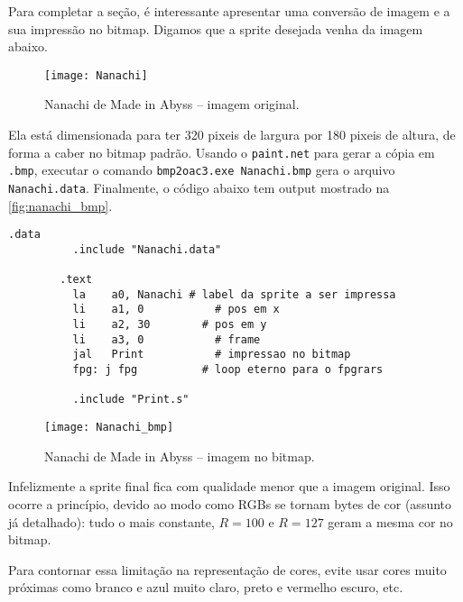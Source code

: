 \documentclass[10pt, a4paper, twoside]{article}
\begin{document}
        Para completar a seção, é interessante apresentar uma conversão de imagem e a sua impressão no bitmap.
        Digamos que a sprite desejada venha da imagem abaixo.
        \begin{figure}[H]\centering
            \caption{Nanachi de Made in Abyss -- imagem original.}
            \texttt{[image: Nanachi]}
        \end{figure}
        Ela está dimensionada para ter 320 pixeis de largura por 180 pixeis de altura, de forma a caber no bitmap padrão.
        Usando o {\tt paint.net} para gerar a cópia em {\tt .bmp}, executar o comando 
        \verb|bmp2oac3.exe Nanachi.bmp| gera o arquivo 
        {\tt Nanachi.data}.
        Finalmente, o código abaixo tem output mostrado na \autoref{fig:nanachi_bmp}.
        \begin{lstlisting}[caption=
            Impressão de sprite gerada a partir de imagem. Note que tanto {\tt Nanchi.data} quanto o {\tt Print.s} estão no mesmo diretório deste programa.
            Em {\tt Print.s} está escrito apenas a função {\tt Print.s} discutida anteriormente.
        ]
        .data
          .include "Nanachi.data"

        .text
          la	a0, Nanachi # label da sprite a ser impressa
          li	a1, 0		    # pos em x
          li	a2, 30		  # pos em y
          li	a3, 0		    # frame
          jal	Print		    # impressao no bitmap
          fpg: j fpg		  # loop eterno para o fpgrars
          
          .include "Print.s"
        \end{lstlisting}
        \begin{figure}[H]\centering
            \caption{Nanachi de Made in Abyss -- imagem no bitmap.}
            \texttt{[image: Nanachi\_bmp]}
            \label{fig:nanachi_bmp}
        \end{figure}
        Infelizmente a sprite final fica com qualidade menor que a imagem original.
        Isso ocorre a princípio, devido ao modo como RGBs se tornam bytes de cor (assunto já detalhado): 
        tudo o mais constante, $R=100$ e $R=127$ geram a mesma cor no bitmap.
        
        \medskip
        
        Para contornar essa limitação na representação de cores, evite usar cores muito próximas como branco e azul muito claro, preto e vermelho escuro, etc.
        
        \medskip
        
\end{document}
